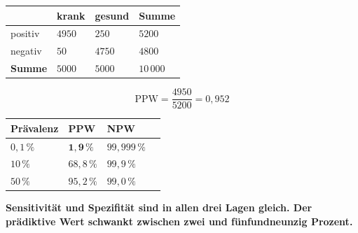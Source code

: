 \begin{merksatz}
\begin{center}
\renewcommand{\arraystretch}{1.5}
\begin{tabular}{@{}P{2.2cm}P{2.0cm}P{2.0cm}P{1.8cm}@{}}
\toprule
& \textbf{krank} & \textbf{gesund} & \textbf{Summe}\\
\midrule
positiv & $4950$ & $250$ & $5200$\\
negativ & $50$ & $4750$ & $4800$\\
\midrule
\textbf{Summe} & $5000$ & $5000$ & $10\,000$\\
\bottomrule
\end{tabular}
\end{center}
\[ \mathrm{PPW} = \frac{4950}{5200} = 0{,}952 \]

\begin{center}
{\small
\renewcommand{\arraystretch}{1.5}
\begin{tabular}{@{}P{2.4cm}P{2.0cm}P{2.0cm}P{1.8cm}@{}}
\toprule
\textbf{Prävalenz} & \textbf{PPW} & \textbf{NPW} & \\
\midrule
$0{,}1\,\%$ & \textcolor{akzent}{$\mathbf{1{,}9\,\%}$} & $99{,}999\,\%$ & \\
$10\,\%$ & $68{,}8\,\%$ & $99{,}9\,\%$ & \\
$50\,\%$ & $95{,}2\,\%$ & $99{,}0\,\%$ & \\
\bottomrule
\end{tabular}}
\end{center}

\begin{center}
\begin{minipage}{0.9\textwidth}
\textbf{Sensitivität und Spezifität sind in allen drei Lagen gleich. Der prädiktive Wert schwankt zwischen zwei und fünfundneunzig Prozent.}
\end{minipage}
\end{center}
\end{merksatz}

